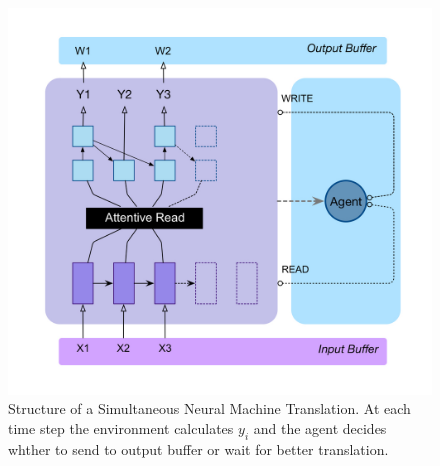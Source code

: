 \documentclass{sfuthesis}
\begin{document}
\begin{figure}[h]
\centering
\includegraphics[scale=0.20]{./images/SNMT0}
\caption[Structure of a Simultaneous Neural Machine Translation.]{Structure of a Simultaneous Neural Machine Translation. At each time step the environment calculates $y_i$ and the agent decides whther to send to output buffer or wait for better translation.}
\label{fig:SNMT0}
\end{figure}

\end{document}
